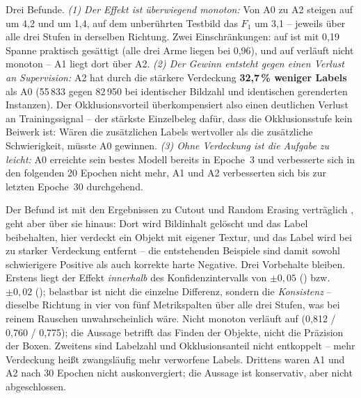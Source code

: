 Drei Befunde. \emph{(1) Der Effekt ist überwiegend monoton:} Von A0 zu A2 steigen
auf  \mAPfifty{} um 4,2\PP{} und \mAPall{} um 1,4\PP{}, auf dem
unberührten Testbild das $F_1$ um 3,1\PP{} -- jeweils über alle drei Stufen in
derselben Richtung. Zwei Einschränkungen: \mAPfifty{} auf  ist mit
0,19\PP{} Spanne praktisch gesättigt (alle drei Arme liegen bei 0,96), und
\mAPall{} auf  verläuft nicht monoton -- A1 liegt dort über A2. \emph{(2) Der Gewinn entsteht gegen einen Verlust an Supervision:} A2
hat durch die stärkere Verdeckung \textbf{32,7\,\% weniger Labels} als A0
(55\,833 gegen 82\,950 bei identischer Bildzahl und identischen gerenderten
Instanzen). Der Okklusionsvorteil überkompensiert also einen deutlichen Verlust an
Trainingssignal -- der stärkste Einzelbeleg dafür, dass die Okklusionsstufe kein
Beiwerk ist: Wären die zusätzlichen Labels wertvoller als die zusätzliche
Schwierigkeit, müsste A0 gewinnen. \emph{(3) Ohne Verdeckung ist die Aufgabe zu
leicht:} A0 erreichte sein bestes Modell bereits in Epoche~3 und verbesserte sich
in den folgenden 20 Epochen nicht mehr, A1 und A2 verbesserten sich bis zur
letzten Epoche~30 durchgehend.

 Der Befund ist mit den Ergebnissen zu
Cutout und Random Erasing verträglich
\parencite{devries2017cutout,zhong2020erasing}, geht aber über sie hinaus: Dort
wird Bildinhalt gelöscht und das Label beibehalten, hier verdeckt ein Objekt mit
eigener Textur, und das Label wird bei zu starker Verdeckung entfernt -- die
entstehenden Beispiele sind damit sowohl schwierigere Positive als auch korrekte
harte Negative. Drei Vorbehalte bleiben. Erstens liegt der Effekt
\emph{innerhalb} des Konfidenzintervalls von $\pm 0{,}05$ () bzw.\
$\pm 0{,}02$ (); belastbar ist nicht die einzelne Differenz, sondern
die \emph{Konsistenz} -- dieselbe Richtung in vier von fünf Metrikspalten über
alle drei Stufen, was bei reinem Rauschen unwahrscheinlich wäre. Nicht monoton
verläuft \mAPseven{} auf \code{val} (0,812 / 0,760 / 0,775); die Aussage betrifft
das Finden der Objekte, nicht die Präzision der Boxen. Zweitens sind Labelzahl und
Okklusionsanteil nicht entkoppelt -- mehr Verdeckung heißt zwangsläufig mehr
verworfene Labels. Drittens waren A1 und A2 nach 30 Epochen nicht auskonvergiert;
die Aussage ist konservativ, aber nicht abgeschlossen.

\iffalse

